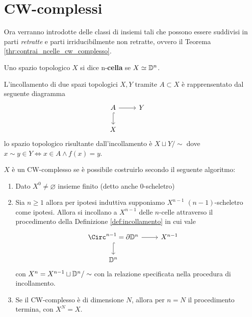 \section{CW-complessi}

Ora verranno introdotte delle classi di insiemi tali che possono essere suddivisi in parti \textit{retratte} e parti irriducibilmente non retratte, ovvero il Teorema \ref{thr:contrai_ncelle_cw_complesso}.

\begin{definition}
	Uno spazio topologico $X$ si dice n-\textbf{cella} se $X \simeq \mathbb{D}^n$.
\end{definition}

\begin{definition}
	\label{def:incollamento}
	L'incollamento di due spazi topologici $X,Y$ tramite $A \subset X$ è rapprensentato dal seguente diagramma
	\begin{equation}
	\begin{tikzcd}
	A \arrow[d, hook]{i} \arrow[r]{f} & Y \\
	X
	\end{tikzcd}
	\end{equation} 
	lo spazio topologico risultante dall'incollamento è $X \sqcup Y / \sim$ dove $x \sim y \in Y \Longleftrightarrow x \in A \land f(x) = y$.
\end{definition}

\begin{definition}
	$X$ è un CW-complesso se è possibile costruirlo secondo il seguente algoritmo:
	\begin{enumerate}
		\item Dato $X^0 \neq \varnothing$ insieme finito (detto anche $0$-scheletro)
		\item Sia $n \ge 1$ allora per ipotesi induttiva supponiamo $X^{n-1}$ $(n-1)$-scheletro come ipotesi. Allora si incollano a $X^{n-1}$ delle $n$-celle attraverso il procedimento della Definizione \ref{def:incollamento} in cui vale 
		\begin{equation}
		\begin{tikzcd}
			\Circ^{n-1} = \partial \D^n \arrow[d, hook]{i} \arrow[r]{f} & X^{n-1} \\
			\D^n
		\end{tikzcd}
		\end{equation} 
		con $X^n = X^{n-1} \sqcup \mathbb{D}^n / \sim$ con la relazione specificata nella procedura di incollamento.
		\item Se il CW-complesso è di dimensione $N$, allora per $n = N$ il procedimento termina, con $X^N = X$.  
	\end{enumerate}
\end{definition}

